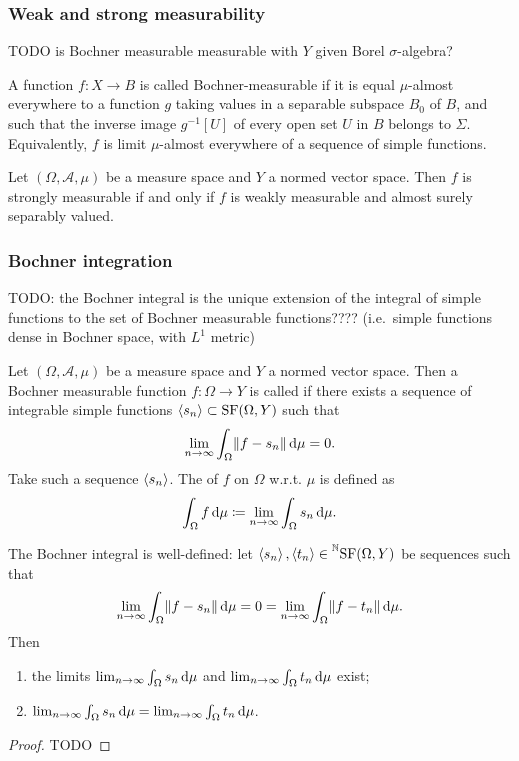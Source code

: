 \subsubsection{Weak and strong measurability}
TODO is Bochner measurable measurable with $Y$ given Borel $\sigma$-algebra?

A function $f:X\to B$ is called Bochner-measurable if it is equal $\mu$-almost everywhere to a function $g$ taking values in a separable subspace $B_{0}$ of $B$, and such that the inverse image $g^{-1}[U]$ of every open set $U$ in $B$ belongs to $\Sigma$. Equivalently, $f$ is limit $\mu$-almost everywhere of a sequence of simple functions. 

\begin{theorem}
Let $(\Omega, \mathcal{A},\mu)$ be a measure space and $Y$ a normed vector space. Then $f$ is strongly measurable \textup{if and only if} $f$ is weakly measurable and almost surely separably valued.
\end{theorem}

\subsubsection{Bochner integration}
TODO: the Bochner integral is the unique extension of the integral of simple functions to the set of Bochner measurable functions???? (i.e.\ simple functions dense in Bochner space, with $L^1$ metric)
\begin{definition}
Let $(\Omega, \mathcal{A},\mu)$ be a measure space and $Y$ a normed vector space. Then a Bochner measurable function $f:\Omega\to Y$ is called  if there exists a sequence of integrable simple functions $\left\langle s_n \right\rangle\subset\operatorname{SF}(\Omega,Y)$ such that
\[ \lim_{n\to\infty}\int_\Omega \lVert f-s_n\rVert\operatorname{d \!}{\mu} = 0. \]
Take such a sequence $\left\langle s_n \right\rangle$. The  of $f$ on $\Omega$ w.r.t. $\mu$ is defined as
\[ \int_\Omega f\operatorname{d \!}{\mu} \coloneqq \lim_{n\to\infty}\int_\Omega s_n\operatorname{d \!}{\mu}. \]
\end{definition}

\begin{lemma}
The Bochner integral is well-defined: let $\left\langle s_n \right\rangle,\left\langle t_n \right\rangle\in \prescript{\mathbb{N}}{}{\operatorname{SF}(\Omega,Y)}$ be sequences such that
\[ \lim_{n\to\infty}\int_\Omega \lVert f-s_n\rVert\operatorname{d \!}{\mu} = 0 = \lim_{n\to\infty}\int_\Omega \lVert f-t_n\rVert\operatorname{d \!}{\mu}.  \]
Then
\begin{enumerate}
\item the limits $\lim_{n\to\infty}\int_\Omega s_n\operatorname{d \!}{\mu}$ and $\lim_{n\to\infty}\int_\Omega t_n\operatorname{d \!}{\mu}$ exist;
\item $\lim_{n\to\infty}\int_\Omega s_n\operatorname{d \!}{\mu} = \lim_{n\to\infty}\int_\Omega t_n\operatorname{d \!}{\mu}$.
\end{enumerate}
\end{lemma}
\begin{proof}
TODO
\end{proof}

